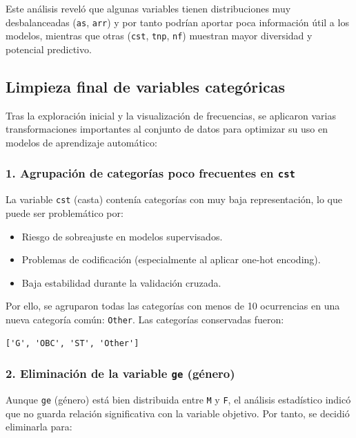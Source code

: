 \documentclass[11pt,a4paper]{article}
\begin{document}
\medskip

Este análisis reveló que algunas variables tienen distribuciones muy desbalanceadas (\texttt{as}, \texttt{arr}) y por tanto podrían aportar poca información útil a los modelos, mientras que otras (\texttt{cst}, \texttt{tnp}, \texttt{nf}) muestran mayor diversidad y potencial predictivo.

\subsection{Limpieza final de variables categóricas}

Tras la exploración inicial y la visualización de frecuencias, se aplicaron varias transformaciones importantes al conjunto de datos para optimizar su uso en modelos de aprendizaje automático:

\subsubsection*{1. Agrupación de categorías poco frecuentes en \texttt{cst}}

La variable \texttt{cst} (casta) contenía categorías con muy baja representación, lo que puede ser problemático por:

\begin{itemize}
    \item Riesgo de sobreajuste en modelos supervisados.
    \item Problemas de codificación (especialmente al aplicar one-hot encoding).
    \item Baja estabilidad durante la validación cruzada.
\end{itemize}

Por ello, se agruparon todas las categorías con menos de 10 ocurrencias en una nueva categoría común: \texttt{Other}. Las categorías conservadas fueron:

\begin{verbatim}
['G', 'OBC', 'ST', 'Other']
\end{verbatim}

\subsubsection*{2. Eliminación de la variable \texttt{ge} (género)}

Aunque \texttt{ge} (género) está bien distribuida entre \texttt{M} y \texttt{F}, el análisis estadístico indicó que no guarda relación significativa con la variable objetivo. Por tanto, se decidió eliminarla para:
\end{document}
